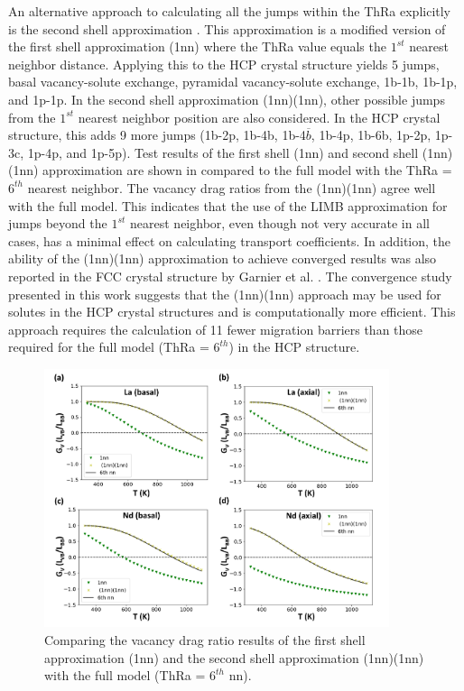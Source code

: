 \documentclass[preprint,12pt]{elsarticle}
\begin{document}
An alternative approach to calculating all the jumps within the ThRa explicitly is the second shell approximation \cite{nastar_mean_2005, garnier_quantitative_2014}. This approximation is a modified version of the first shell approximation (1nn) where the ThRa value equals the $1^{st}$ nearest neighbor distance. Applying this to the HCP crystal structure yields 5 jumps, basal vacancy-solute exchange, pyramidal vacancy-solute exchange, 1b-1b, 1b-1p, and 1p-1p. In the second shell approximation (1nn)(1nn), other possible jumps from the $1^{st}$ nearest neighbor position are also considered. In the HCP crystal structure, this adds 9 more jumps (1b-2p, 1b-4b, 1b-4$\overline{b}$, 1b-4p, 1b-6b, 1p-2p, 1p-3c, 1p-4p, and 1p-5p). Test results of the first shell (1nn) and second shell (1nn)(1nn) approximation are shown in  compared to the full model with the ThRa = $6^{th}$ nearest neighbor. The vacancy drag ratios from the (1nn)(1nn) agree well with the full model. This indicates that the use of the LIMB approximation for jumps beyond the $1^{st}$ nearest neighbor, even though not very accurate in all cases, has a minimal effect on calculating transport coefficients. In addition, the ability of the (1nn)(1nn) approximation to achieve converged results was also reported in the FCC crystal structure by Garnier et al. \cite{garnier_quantitative_2014}. The convergence study presented in this work suggests that the (1nn)(1nn) approach may be used for solutes in the HCP crystal structures and is computationally more efficient. This approach requires the calculation of 11 fewer migration barriers than those required for the full model (ThRa = $6^{th}$) in the HCP structure.

\begin{figure}[h!]
    \centering
    \includegraphics[width=0.9\textwidth]{11_nn_convergence_2nd_shell.jpg}
    \caption{Comparing the vacancy drag ratio results of the first shell approximation (1nn) and the second shell approximation (1nn)(1nn) with the full model (ThRa = $6^{th}$ nn).}
    \label{fig:convergence_2nd_shell}
\end{figure}
\end{document}
